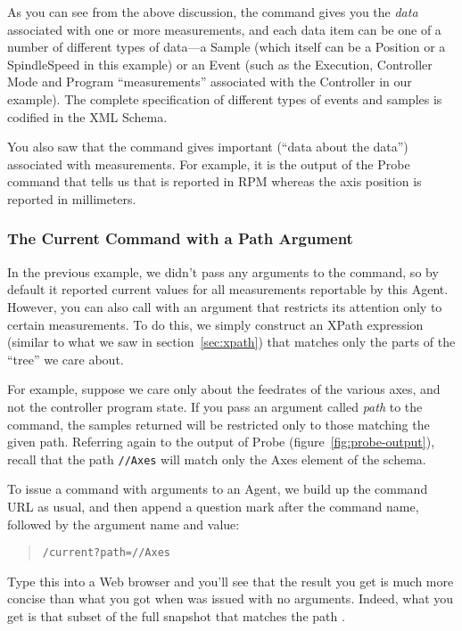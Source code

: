 As you can see from the above discussion, the  command
gives you  the \emph{data}
associated with one or more measurements, and each data item can be one
of a number of different types of data---a Sample (which itself can be a
Position or a SpindleSpeed in this example) or an Event (such as the
Execution, Controller Mode and Program ``measurements'' associated with
the Controller in our example).  The complete specification of 
different types of events and samples is codified in the \mtc{} XML
Schema.

You also saw that the  command gives important
 (``data about the data'') associated with
measurements.  For example, it is the output of the Probe command that
tells us that   is reported in RPM whereas the 
axis position is reported in millimeters.

\subsubsection{The Current Command with a Path Argument}
\label{sec:cmd:current-with-path}

In the previous example, we didn't pass any arguments to the
 command, so by default it reported current values for
all measurements reportable by this Agent.  However, you can also call
 with an argument that restricts its attention only to
certain measurements.  To do this, we simply construct an XPath
expression (similar to what we saw in section~\ref{sec:xpath}) that
matches only the parts of the ``tree'' we care about.

For example, suppose we care only about the feedrates of the various
axes, and not the controller program state.  If you pass an argument
called \emph{path} to the  command, the samples returned
will be restricted only to those matching the given path.  Referring
again to the output of Probe (figure~\ref{fig:probe-output}), recall
that the path \texttt{//Axes} will match only the Axes element of the
schema.  

To issue a command with arguments to an Agent, we build up the command
URL as usual, and then
append a question mark after the command name, followed by the
argument name and value:

\begin{quotation}
\texttt{\agenturl/current?path=//Axes}
\end{quotation}

Type this into a Web browser and you'll see that the result you get is
much more concise than what you got when  was issued with
no arguments.  Indeed, what you get is that subset of the full snapshot
that matches the path .

